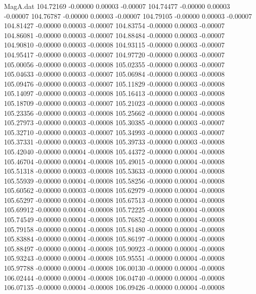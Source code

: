 \begin{filecontents}{MagA.dat}
 104.72169   -0.00000    0.00003   -0.00007
 104.74477   -0.00000    0.00003   -0.00007
 104.76787   -0.00000    0.00003   -0.00007
 104.79105   -0.00000    0.00003   -0.00007
 104.81427   -0.00000    0.00003   -0.00007
 104.83754   -0.00000    0.00003   -0.00007
 104.86081   -0.00000    0.00003   -0.00007
 104.88484   -0.00000    0.00003   -0.00007
 104.90810   -0.00000    0.00003   -0.00008
 104.93115   -0.00000    0.00003   -0.00007
 104.95417   -0.00000    0.00003   -0.00007
 104.97720   -0.00000    0.00003   -0.00007
 105.00056   -0.00000    0.00003   -0.00008
 105.02355   -0.00000    0.00003   -0.00007
 105.04633   -0.00000    0.00003   -0.00007
 105.06984   -0.00000    0.00003   -0.00008
 105.09476   -0.00000    0.00003   -0.00007
 105.11829   -0.00000    0.00003   -0.00008
 105.14097   -0.00000    0.00003   -0.00008
 105.16413   -0.00000    0.00003   -0.00008
 105.18709   -0.00000    0.00003   -0.00007
 105.21023   -0.00000    0.00003   -0.00008
 105.23356   -0.00000    0.00003   -0.00008
 105.25662   -0.00000    0.00004   -0.00008
 105.27973   -0.00000    0.00003   -0.00008
 105.30385   -0.00000    0.00003   -0.00007
 105.32710   -0.00000    0.00003   -0.00007
 105.34993   -0.00000    0.00003   -0.00007
 105.37331   -0.00000    0.00003   -0.00008
 105.39733   -0.00000    0.00003   -0.00008
 105.42040   -0.00000    0.00004   -0.00008
 105.44372   -0.00000    0.00004   -0.00008
 105.46704   -0.00000    0.00004   -0.00008
 105.49015   -0.00000    0.00004   -0.00008
 105.51318   -0.00000    0.00003   -0.00008
 105.53633   -0.00000    0.00004   -0.00008
 105.55939   -0.00000    0.00004   -0.00008
 105.58256   -0.00000    0.00004   -0.00008
 105.60562   -0.00000    0.00003   -0.00008
 105.62979   -0.00000    0.00004   -0.00008
 105.65297   -0.00000    0.00004   -0.00008
 105.67513   -0.00000    0.00004   -0.00008
 105.69912   -0.00000    0.00004   -0.00008
 105.72225   -0.00000    0.00004   -0.00008
 105.74549   -0.00000    0.00004   -0.00008
 105.76852   -0.00000    0.00004   -0.00008
 105.79158   -0.00000    0.00004   -0.00008
 105.81480   -0.00000    0.00004   -0.00008
 105.83884   -0.00000    0.00004   -0.00008
 105.86197   -0.00000    0.00004   -0.00008
 105.88497   -0.00000    0.00004   -0.00008
 105.90923   -0.00000    0.00004   -0.00008
 105.93243   -0.00000    0.00004   -0.00008
 105.95551   -0.00000    0.00004   -0.00008
 105.97788   -0.00000    0.00004   -0.00008
 106.00130   -0.00000    0.00004   -0.00008
 106.02444   -0.00000    0.00004   -0.00008
 106.04740   -0.00000    0.00004   -0.00008
 106.07135   -0.00000    0.00004   -0.00008
 106.09426   -0.00000    0.00004   -0.00008

\end{filecontents}

